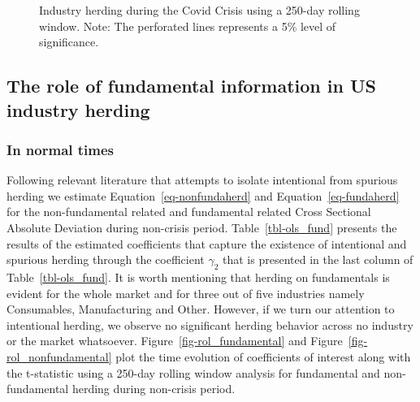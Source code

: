 \documentclass[
  letterpaper,
  DIV=11,
  numbers=noendperiod]{scrartcl}
\begin{document}
\begin{figure}[H]


\caption{\label{fig-rol_crisis_cv}Industry herding during the Covid
Crisis using a 250-day rolling window. Note: The perforated lines
represents a 5\% level of significance.}

\end{figure}%

\subsection{The role of fundamental information in US industry
herding}\label{the-role-of-fundamental-information-in-us-industry-herding}

\subsubsection{In normal times}\label{in-normal-times}

Following relevant literature that attempts to isolate intentional from
spurious herding \citetext{\citealp[ for institutional
investors]{holmes2013herding}; \citealp[ for stock market
investors]{galariotis2015herding}} we estimate
Equation~\ref{eq-nonfundaherd} and Equation~\ref{eq-fundaherd} for the
non-fundamental related and fundamental related Cross Sectional Absolute
Deviation during non-crisis period. Table~\ref{tbl-ols_fund} presents
the results of the estimated coefficients that capture the existence of
intentional and spurious herding through the coefficient \(\gamma_2\)
that is presented in the last column of Table~\ref{tbl-ols_fund}. It is
worth mentioning that herding on fundamentals is evident for the whole
market and for three out of five industries namely Consumables,
Manufacturing and Other. However, if we turn our attention to
intentional herding, we observe no significant herding behavior across
no industry or the market whatsoever. Figure~\ref{fig-rol_fundamental}
and Figure~\ref{fig-rol_nonfundamental} plot the time evolution of
coefficients of interest along with the t-statistic using a 250-day
rolling window analysis for fundamental and non-fundamental herding
during non-crisis period.
\end{document}
